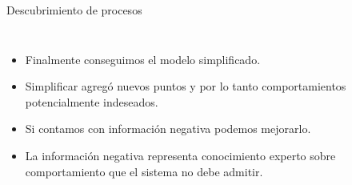 \documentclass[spanish,pdf]{beamer}
\begin{document}
\begin{frame}{Descubrimiento de procesos}{}
  \begin{columns}
      \begin{itemize}
        \setlength\itemsep{0.2cm}
        \item<1-> Finalmente conseguimos el modelo simplificado.
        \item<3-> Simplificar agregó nuevos puntos y por lo tanto comportamientos potencialmente indeseados.
        \item<5-> Si contamos con información negativa podemos mejorarlo.
        \item<7-> La información negativa representa conocimiento experto sobre comportamiento 
                  que el sistema no debe admitir.
      \end{itemize}
\end{columns}
\end{frame}
\end{document}
